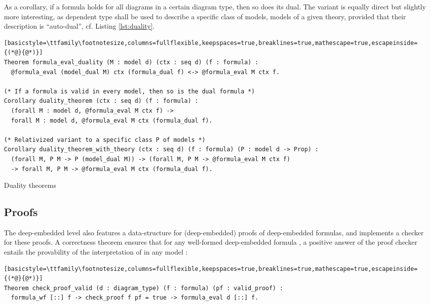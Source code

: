 As a corollary, if a formula holds for all diagrams in a certain diagram type, then so does its dual. The variant  is equally direct but slightly more interesting, as dependent type  shall be used to describe a specific class of models, \eg{} models of a given theory, provided that their description is \enquote{auto-dual}, cf. Listing \ref{lst:duality}.
\begin{listing}[h!]
\begin{lstlisting}[basicstyle=\ttfamily\footnotesize,columns=fullflexible,keepspaces=true,breaklines=true,mathescape=true,escapeinside={(*@}{@*)}]
Theorem formula_eval_duality (M : model d) (ctx : seq d) (f : formula) :
  @formula_eval (model_dual M) ctx (formula_dual f) <-> @formula_eval M ctx f.

(* If a formula is valid in every model, then so is the dual formula *)
Corollary duality_theorem (ctx : seq d) (f : formula) :
  (forall M : model d, @formula_eval M ctx f) ->
  forall M : model d, @formula_eval M ctx (formula_dual f).

(* Relativized variant to a specific class P of models *)
Corollary duality_theorem_with_theory (ctx : seq d) (f : formula) (P : model d -> Prop) :
  (forall M, P M -> P (model_dual M)) -> (forall M, P M -> @formula_eval M ctx f)
  -> forall M, P M -> @formula_eval M ctx (formula_dual f).
\end{lstlisting}
\caption{Duality theorems}\label{lst:duality}
\end{listing}



\subsection{Proofs}

The deep-embedded level also features a data-structure  for (deep-embedded) proofs of deep-embedded formulas, and implements a checker  for these proofs. A correctness theorem ensures that for any well-formed deep-embedded formula , a positive answer of the proof checker entails the provability of the interpretation of  in any model :
\begin{lstlisting}[basicstyle=\ttfamily\footnotesize,columns=fullflexible,keepspaces=true,breaklines=true,mathescape=true,escapeinside={(*@}{@*)}]
Theorem check_proof_valid (d : diagram_type) (f : formula) (pf : valid_proof) :
  formula_wf [::] f -> check_proof f pf = true -> formula_eval d [::] f.
\end{lstlisting}

